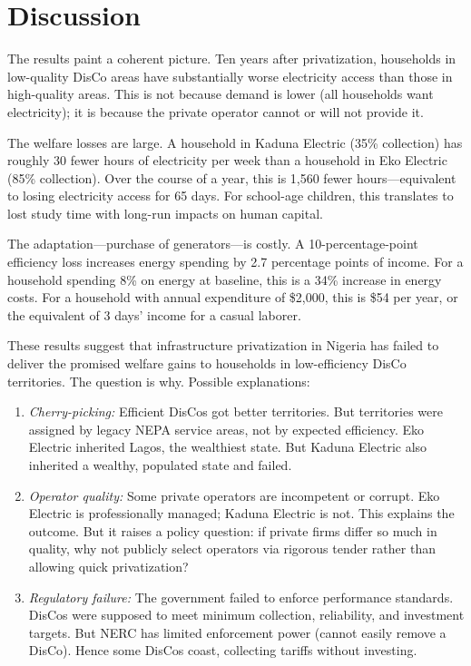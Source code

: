 \documentclass[12pt]{article}
\begin{document}


\section{Discussion}

The results paint a coherent picture. Ten years after privatization, households in low-quality DisCo areas have substantially worse electricity access than those in high-quality areas. This is not because demand is lower (all households want electricity); it is because the private operator cannot or will not provide it.

The welfare losses are large. A household in Kaduna Electric (35\% collection) has roughly 30 fewer hours of electricity per week than a household in Eko Electric (85\% collection). Over the course of a year, this is 1,560 fewer hours---equivalent to losing electricity access for 65 days. For school-age children, this translates to lost study time with long-run impacts on human capital.

The adaptation---purchase of generators---is costly. A 10-percentage-point efficiency loss increases energy spending by 2.7 percentage points of income. For a household spending 8\% on energy at baseline, this is a 34\% increase in energy costs. For a household with annual expenditure of \$2,000, this is \$54 per year, or the equivalent of 3 days' income for a casual laborer.

These results suggest that infrastructure privatization in Nigeria has failed to deliver the promised welfare gains to households in low-efficiency DisCo territories. The question is why. Possible explanations:
\begin{enumerate}
\item \textit{Cherry-picking:} Efficient DisCos got better territories. But territories were assigned by legacy NEPA service areas, not by expected efficiency. Eko Electric inherited Lagos, the wealthiest state. But Kaduna Electric also inherited a wealthy, populated state and failed.
\item \textit{Operator quality:} Some private operators are incompetent or corrupt. Eko Electric is professionally managed; Kaduna Electric is not. This explains the outcome. But it raises a policy question: if private firms differ so much in quality, why not publicly select operators via rigorous tender rather than allowing quick privatization?
\item \textit{Regulatory failure:} The government failed to enforce performance standards. DisCos were supposed to meet minimum collection, reliability, and investment targets. But NERC has limited enforcement power (cannot easily remove a DisCo). Hence some DisCos coast, collecting tariffs without investing.
\end{enumerate}
\end{document}
